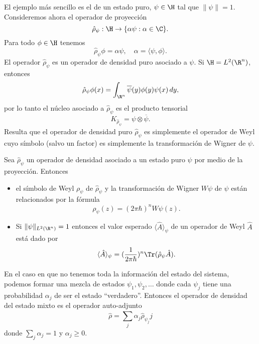   El ejemplo más sencillo es el de un estado puro, $\psi \in
  \H$ tal que $\|\psi\| = 1$. Consideremos ahora el operador
  de proyección
  \[
    \hat{\rho}_\psi : \H \to \{\alpha \psi : \alpha \in
    \C\}.
  \] 
  Para todo $\phi \in \H$ tenemos
  \[
    \hat{\rho}_\psi \phi
    = \alpha \psi,
    \quad \alpha = \langle \psi, \phi \rangle.
  \] 
  El operador $\hat{\rho}_\psi$ es un operador de densidad
  puro asociado a $\psi$. Si $\H = L^2(\R^{n})$, entonces
  \[
    \hat{\rho}_\psi \phi(x)
    = \int_{\R^{n}} \overline{\psi}(y)\phi(y) \psi(x) \, dy,
  \] 
  por lo tanto el núcleo asociado a $\hat{\rho}_\psi$ es el
  producto tensorial
  \[
    K_{\hat{\rho}_\psi} = \psi \otimes \overline{\psi}.
  \] 
  Resulta que el operador de densidad puro $\hat{\rho}_\psi$ 
  es simplemente el operador de Weyl cuyo símbolo (salvo un
  factor) es simplemente la transformación de Wigner de
  $\psi$.

  \begin{proposition}
    Sea $\hat{\rho}_\psi$ un operador de densidad asociado a
    un estado puro $\psi$ por medio de la proyección.
    Entonces
    \begin{itemize}
      \item el símbolo de Weyl $\rho_\psi$ de
        $\hat{\rho}_\psi$ y la transformación de Wigner
        $W\psi$ de $\psi$ están relacionados por la fórmula
        \begin{equation}
          \rho_\psi(z)
          = (2\pi\hbar)^{n} W\psi(z).
        \end{equation}
      \item Si $\|\psi\|_{L^2(\R^{n})} = 1$ entonces el
        valor esperado $\langle \hat{A} \rangle_\psi$ de un
        operador de Weyl $\hat{A}$ está dado por
        \[
          \langle \hat{A} \rangle_\psi
          = (\frac{1}{2\pi\hbar})^{n} \Tr(\hat{\rho}_\psi
          \hat{A}).
        \] 
    \end{itemize}
  \end{proposition}

  En el caso en que no tenemos toda la información del
  estado del sistema, podemos formar una mezcla de estados
  $\psi_1,\psi_2,\ldots$ donde cada $\psi_j$ tiene una
  probabilidad $\alpha_j$ de ser el estado ``verdadero''.
  Entonces el operador de densidad del estado mixto es el
  operador auto-adjunto
  \[
    \hat{\rho}
    = \sum_{j}^{} \alpha_j \hat{\rho}_{\psi_j}j
  \] 
  donde $\sum_{j}^{} \alpha_j = 1$ y $\alpha_j \geq 0$.

